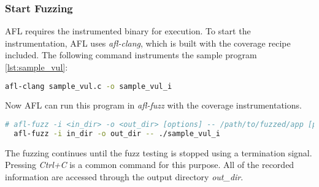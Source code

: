 \subsubsection*{Start Fuzzing}

AFL requires the instrumented binary for execution. To start the instrumentation, AFL uses \textit{afl-clang}, which is built with the coverage recipe included. The following command instruments the sample program \ref{lst:sample_vul}:

\begin{lstlisting}[language=bash,style=CommandStyle,caption=Instrument $sample\_vul$.c]
    afl-clang sample_vul.c -o sample_vul_i
\end{lstlisting}

Now AFL can run this program in \textit{afl-fuzz} with the coverage instrumentations.

\begin{lstlisting}[language=bash,style=CommandStyle,caption=Execute AFL]
  # afl-fuzz -i <in_dir> -o <out_dir> [options] -- /path/to/fuzzed/app [params]
  afl-fuzz -i in_dir -o out_dir -- ./sample_vul_i
\end{lstlisting}

The fuzzing continues until the fuzz testing is stopped using a termination signal. Pressing \textit{Ctrl+C} is a common command for this purpose. All of the recorded information are accessed through the output directory \textit{out\_dir}.